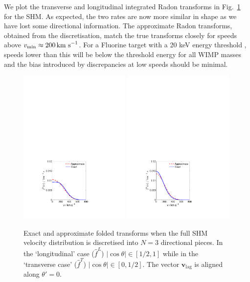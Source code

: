 We plot the transverse and longitudinal integrated Radon transforms in Fig.~\ref{fig:directional:radonN3folded} for the SHM. As expected, the two rates are now more similar in shape as we have lost some directional information. The approximate Radon transforms, obtained from the discretisation, match the true transforms closely for speeds above $\vmin\approx 200 \kms$. For a Fluorine target with a 20 keV energy threshold \cite{Daw:2011}, speeds lower than this will be below the threshold energy for all WIMP masses and the bias introduced by discrepancies at low speeds should be minimal.

\begin{figure}[t]

  \centering

  \includegraphics[trim={3.5cm 2cm 7.5cm 17cm},clip,width=0.49\textwidth]{Directional/SHMfolded_N3_L.pdf}
  \includegraphics[trim={3.5cm 2cm 7.5cm 17cm},clip,width=0.49\textwidth]{Directional/SHMfolded_N3_T.pdf}

\caption[Exact and approximate folded Radon transforms for $N=3$ components in the SHM]{Exact and approximate folded transforms when the full SHM velocity distribution is discretised into $N = 3$ directional pieces. In the `longitudinal' case ($\hat{f}^L$) $|\cos\theta| \in [1/2,1]$ while in the `transverse case' ($\hat{f}^T$) $|\cos\theta| \in [0, 1/2]$. The vector $\textbf{v}_\textrm{lag}$ is aligned along $\theta' = 0$.}
\label{fig:directional:radonN3folded}
\end{figure}

